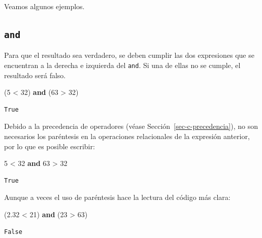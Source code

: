 \documentclass[
  spanish,
  letterpaper,
]{scrbook}
\newenvironment{Shaded}{\begin{snugshade}}{\end{snugshade}}
\newcommand{\DecValTok}[1]{\textcolor[rgb]{0.68,0.00,0.00}{#1}}
\newcommand{\FloatTok}[1]{\textcolor[rgb]{0.68,0.00,0.00}{#1}}
\newcommand{\KeywordTok}[1]{\textcolor[rgb]{0.00,0.23,0.31}{\textbf{#1}}}
\newcommand{\NormalTok}[1]{\textcolor[rgb]{0.00,0.23,0.31}{#1}}
\newcommand{\OperatorTok}[1]{\textcolor[rgb]{0.37,0.37,0.37}{#1}}
\theoremstyle{definition}
\theoremstyle{remark}
\begin{document}
Veamos algunos ejemplos.

\subsection{\texorpdfstring{\texttt{and}}{and}}\label{and}

Para que el resultado sea verdadero, se deben cumplir las dos
expresiones que se encuentran a la derecha e izquierda del \texttt{and}.
Si una de ellas no se cumple, el resultado será falso.

\begin{Shaded}
\begin{Highlighting}[]
\NormalTok{(}\DecValTok{5} \OperatorTok{\textless{}} \DecValTok{32}\NormalTok{) }\KeywordTok{and}\NormalTok{ (}\DecValTok{63} \OperatorTok{\textgreater{}} \DecValTok{32}\NormalTok{) }
\end{Highlighting}
\end{Shaded}

\begin{verbatim}
True
\end{verbatim}

Debido a la precedencia de operadores (véase
Sección~\ref{sec-c-precedencia}), no son necesarios los paréntesis en la
operaciones relacionales de la expresión anterior, por lo que es posible
escribir:

\begin{Shaded}
\begin{Highlighting}[]
\DecValTok{5} \OperatorTok{\textless{}} \DecValTok{32} \KeywordTok{and} \DecValTok{63} \OperatorTok{\textgreater{}} \DecValTok{32}
\end{Highlighting}
\end{Shaded}

\begin{verbatim}
True
\end{verbatim}

Aunque a veces el uso de paréntesis hace la lectura del código más
clara:

\begin{Shaded}
\begin{Highlighting}[]
\NormalTok{(}\FloatTok{2.32} \OperatorTok{\textless{}} \DecValTok{21}\NormalTok{) }\KeywordTok{and}\NormalTok{ (}\DecValTok{23} \OperatorTok{\textgreater{}} \DecValTok{63}\NormalTok{)}
\end{Highlighting}
\end{Shaded}

\begin{verbatim}
False
\end{verbatim}
\end{document}
